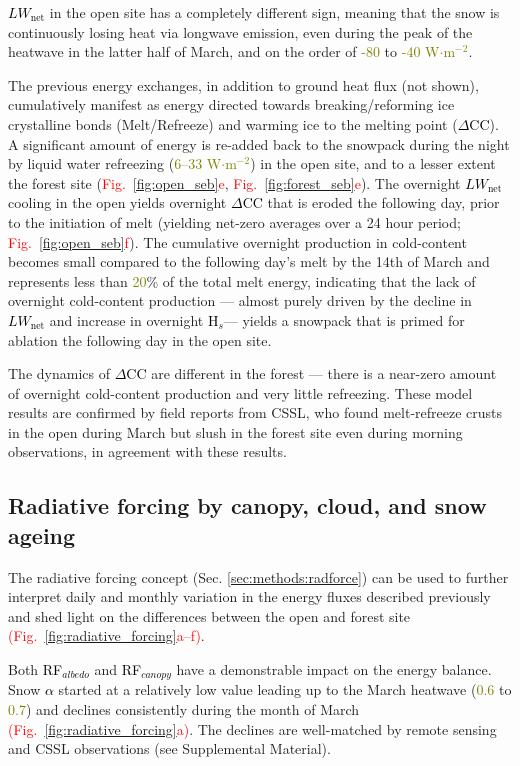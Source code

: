 \documentclass[draft]{agujournal2019}
\newcommand{\fig}[2]{\textcolor{red}{(Fig.~\ref{#1}{#2})}}   %
\newcommand{\fignop}[2]{\textcolor{red}{Fig.~\ref{#1}{#2}}}  %
\newcommand{\mynum}[1]{\textcolor{olive}{#1}}
\newcommand{\lwnet}{\textcolor{black}{$LW_{\mathrm{net}}$}\xspace}
\newcommand{\hs}{\textcolor{black}{H$_s$}\xspace}
\newcommand{\dcc}{\textcolor{black}{$\Delta$CC}\xspace}
\newcommand{\albedo}{\textcolor{black}{$\alpha$}\xspace}
\newcommand{\rfalb}{\textcolor{black}{RF$_{albedo}$}\xspace}
\newcommand{\rfcanopy}{\textcolor{black}{RF$_{canopy}$}\xspace}
\newcommand{\wmsq}{\textcolor{olive}{W$\cdot$m$^{-2}$}\xspace}
\begin{document}
\lwnet in the open site has a completely different sign, meaning that the snow is continuously losing heat via longwave emission, even during the peak of the heatwave in the latter half of March, and on the order of \mynum{-80} to \mynum{-40} \wmsq.

The previous energy exchanges, in addition to ground heat flux (not shown), cumulatively manifest as energy directed towards breaking/reforming ice crystalline bonds (Melt/Refreeze) and warming ice to the melting point (\dcc).
A significant amount of energy is re-added back to the snowpack during the night by liquid water refreezing (\mynum{6--33} \wmsq) in the open site, and to a lesser extent the forest site (\fignop{fig:open_seb}{e}, \fignop{fig:forest_seb}{e}).
The overnight \lwnet cooling in the open yields overnight \dcc that is eroded the following day, prior to the initiation of melt (yielding net-zero averages over a 24 hour period; \fignop{fig:open_seb}{f}).
The cumulative overnight production in cold-content becomes small compared to the following day's melt by the 14th of March and represents less than \mynum{20}\% of the total melt energy, indicating that the lack of overnight cold-content production --- almost purely driven by the decline in \lwnet and increase in overnight \hs --- yields a snowpack that is primed for ablation the following day in the open site.

The dynamics of \dcc are different in the forest --- there is a near-zero amount of overnight cold-content production and very little refreezing.
These model results are confirmed by field reports from CSSL, who found melt-refreeze crusts in the open during March but slush in the forest site even during morning observations, in agreement with these results.



\subsection{Radiative forcing by canopy, cloud, and snow ageing}
The radiative forcing concept (Sec. \ref{sec:methods:radforce}) can be used to further interpret daily and monthly variation in the energy fluxes described previously and shed light on the differences between the open and forest site \fig{fig:radiative_forcing}{a--f}.

Both \rfalb and \rfcanopy have a demonstrable impact on the energy balance.
Snow \albedo started at a relatively low value leading up to the March heatwave (\mynum{0.6} to \mynum{0.7}) and declines consistently during the month of March \fig{fig:radiative_forcing}{a}.
The declines are well-matched by remote sensing and CSSL observations (see Supplemental Material).
\end{document}
